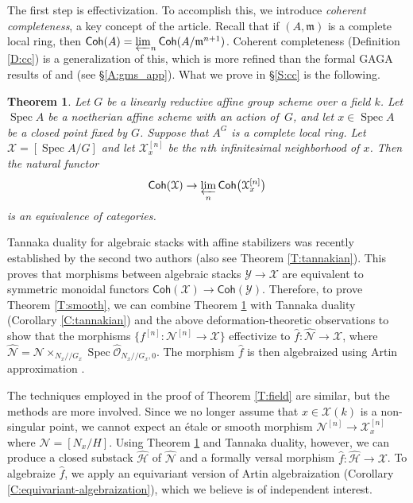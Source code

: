 \documentclass[a4paper]{amsart}
\theoremstyle{plain}
\newtheorem{theorem}{Theorem}[section]
\theoremstyle{definition}
\theoremstyle{remark}
\numberwithin{equation}{section}
\newcommand{\fm}{\mathfrak{m}}
\newcommand\cH{\mathcal{H}}
\newcommand\cN{\mathcal{N}}
\newcommand\cX{\mathcal{X}}
\newcommand\cY{\mathcal{Y}}
\newcommand\oh{\mathcal{O}}
\newcommand\Coh{\mathsf{Coh}}
\DeclareMathOperator{\Spec}{Spec}
\newcommand{\gitq}{/\!\!/}
\newcommand{\ilim}{\varprojlim}
\renewcommand{\hat}{\widehat}
\begin{document}
The first step is effectivization. To accomplish this, we introduce \emph{coherent completeness}, a key concept of the article. Recall that if $(A,\fm)$ is a complete local ring, then 
$\Coh(A) = \ilim_n \Coh(A/\fm^{n+1})$. Coherent completeness (Definition \ref{D:cc}) is a generalization of this, 
which is more refined than the formal GAGA results of \cite[III.5.1.4]{EGA} and 
\cite{geraschenko-brown} (see \S\ref{A:gms_app}). What we prove in \S\ref{S:cc} is the 
following.
\begin{theorem} \label{key-theorem}
Let $G$ be a linearly reductive affine group scheme over a field $k$. Let $\Spec A$ be a noetherian affine scheme with an action of~$G$, and let $x \in \Spec A$ be a closed point fixed by $G$.   Suppose that $A^{G}$ is a complete local ring. Let $\cX = [\Spec A / G]$ and let $\cX^{[n]}_x$ be the $n$th infinitesimal neighborhood of $x$.  Then the natural functor
\begin{equation} \label{eqn-coh}
\Coh(\cX)  \to  \ilim_n \Coh\bigl(\cX^{[n]}_x\bigr)
\end{equation}
is an equivalence of categories.
\end{theorem}
Tannaka duality for algebraic stacks with affine stabilizers was recently established by the 
second two authors \cite[Thm.~1.1]{hallj_dary_coherent_tannakian_duality} (also see 
Theorem \ref{T:tannakian}). This proves that morphisms between algebraic stacks $\cY \to \cX$ are equivalent to symmetric monoidal functors $\Coh(\cX) \to \Coh(\cY)$. Therefore, to prove Theorem \ref{T:smooth}, we can  combine Theorem \ref{key-theorem} with Tannaka duality (Corollary \ref{C:tannakian}) and the above deformation-theoretic observations to show that the morphisms $\{f^{[n]} \colon \cN^{[n]} \to \cX\}$ effectivize to $\hat{f} \colon \hat{\cN} \to \cX$, where $\hat{\cN} = \cN \times_{N_x\gitq G_x} \Spec \hat{\oh}_{N_x\gitq G_x,0}$. 
The morphism $\hat{f}$ is then algebraized using Artin approximation \cite{artin-approx}. 

The techniques employed in the proof of Theorem \ref{T:field} are similar, but the methods are more involved. Since we no longer assume that $x \in \cX(k)$ is a non-singular point, we cannot expect an \'etale or smooth morphism $\cN^{[n]}\to \cX_x^{[n]}$ where $\cN=[N_x/H]$. Using Theorem \ref{key-theorem} and Tannaka duality, however, we can produce a closed substack $\hat{\cH}$ of $\hat{\cN}$ and a formally versal morphism $\hat{f} \colon \hat{\cH} \to \cX$. To algebraize $\hat{f}$, we apply an equivariant version of Artin algebraization (Corollary \ref{C:equivariant-algebraization}), which we believe is of independent interest.
\end{document}
